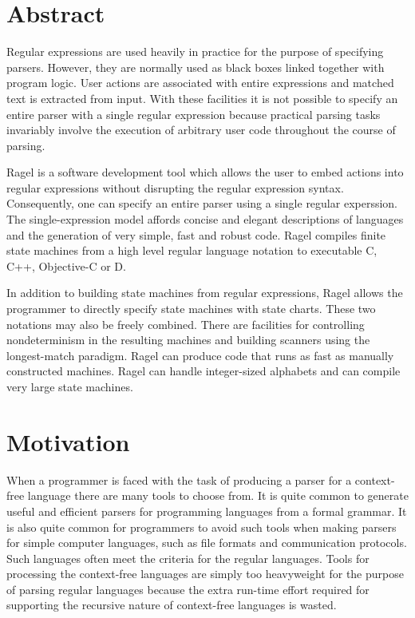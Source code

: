 \documentclass[letterpaper,11pt,oneside]{book}
\begin{document}
\section{Abstract}

Regular expressions are used heavily in practice for the purpose of specifying
parsers. However, they are normally used as black boxes linked together with
program logic. User actions are associated with entire expressions and matched
text is extracted from input.  With these facilities it is not possible to
specify an entire parser with a single regular expression because practical
parsing tasks invariably involve the execution of arbitrary user code
throughout the course of parsing.  

Ragel is a software development tool which allows the user to embed actions into
regular expressions without disrupting the regular expression syntax.
Consequently, one can specify an entire parser using a single regular
experssion.  The single-expression model affords concise
and elegant descriptions of languages and the generation of very simple,
fast and robust code.  Ragel compiles finite state machines from a high level
regular language notation to executable C, C++, Objective-C or D. 

In addition to building state machines from regular expressions, Ragel allows
the programmer to directly specify state machines with state charts. These two
notations may also be freely combined. There are facilities for controlling
nondeterminism in the resulting machines and building scanners using the
longest-match paradigm.  Ragel can produce code that runs as fast as manually
constructed machines.  Ragel can handle integer-sized alphabets and can compile
very large state machines.

\section{Motivation}

When a programmer is faced with the task of producing a parser for a
context-free language there are many tools to choose from. It is quite common
to generate useful and efficient parsers for programming languages from a
formal grammar. It is also quite common for programmers to avoid such tools
when making parsers for simple computer languages, such as file formats and
communication protocols.  Such languages often meet the criteria for the
regular languages.  Tools for processing the context-free languages are simply
too heavyweight for the purpose of parsing regular languages because the extra
run-time effort required for supporting the recursive nature of context-free
languages is wasted.
\end{document}
